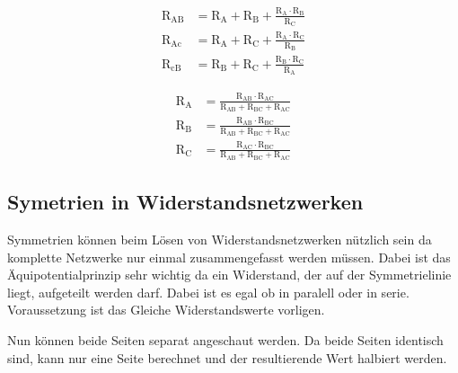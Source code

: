 \begin{minipage}[b]{0.55\linewidth}
    \centering

    

\end{minipage}%
\begin{minipage}[b]{0.45\linewidth}
    \centering
    \[
    \begin{aligned}
        \text{R}_\text{AB} &= \text{R}_\text{A} + \text{R}_\text{B} + \frac{\text{R}_\text{A}\cdot\text{R}_\text{B}}{\text{R}_\text{C}}\\
        \text{R}_\text{Ac} &= \text{R}_\text{A} + \text{R}_\text{C} + \frac{\text{R}_\text{A}\cdot\text{R}_\text{C}}{\text{R}_\text{B}}\\
        \text{R}_\text{cB} &= \text{R}_\text{B} + \text{R}_\text{C} + \frac{\text{R}_\text{B}\cdot\text{R}_\text{C}}{\text{R}_\text{A}}
    \end{aligned}
    \]

    \vspace{4ex}
\end{minipage} 
\begin{minipage}[b]{0.55\linewidth}
    \centering

    

    \vspace{4ex}
\end{minipage}%
\begin{minipage}[b]{0.45\linewidth}
    \centering
    \[
    \begin{aligned}
        \text{R}_\text{A} &= \frac{\text{R}_\text{AB}\cdot\text{R}_\text{AC}}{\text{R}_\text{AB}+\text{R}_\text{BC}+\text{R}_\text{AC}}\\
        \text{R}_\text{B} &= \frac{\text{R}_\text{AB}\cdot\text{R}_\text{BC}}{\text{R}_\text{AB}+\text{R}_\text{BC}+\text{R}_\text{AC}}\\
        \text{R}_\text{C} &= \frac{\text{R}_\text{AC}\cdot\text{R}_\text{BC}}{\text{R}_\text{AB}+\text{R}_\text{BC}+\text{R}_\text{AC}}
    \end{aligned}
    \]

    \vspace{4ex}
\end{minipage} 


\subsection{Symetrien in Widerstandsnetzwerken}

Symmetrien können beim Lösen von Widerstandsnetzwerken nützlich sein da komplette Netzwerke nur einmal zusammengefasst werden müssen. 
Dabei ist das Äquipotentialprinzip sehr wichtig da ein Widerstand, der auf der Symmetrielinie liegt, aufgeteilt werden darf. 
Dabei ist es egal ob in paralell oder in serie. 
Voraussetzung ist das Gleiche Widerstandswerte vorligen.



Nun können beide Seiten separat angeschaut werden. 
Da beide Seiten identisch sind, kann nur eine Seite berechnet und der resultierende Wert halbiert werden. 